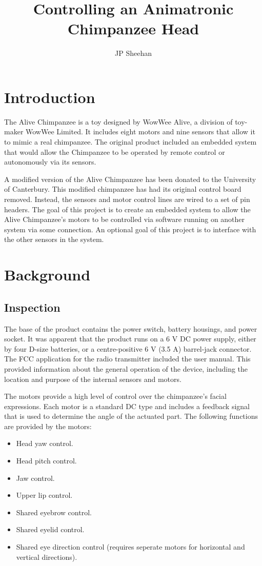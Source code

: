 \documentclass[11pt]{article} %
\title{Controlling an Animatronic Chimpanzee Head}
\author{JP Sheehan}
\begin{document}
\maketitle

\section{Introduction}

The Alive Chimpanzee is a toy designed by WowWee Alive, a division of toy-maker WowWee Limited. %
It includes eight motors and nine sensors that allow it to mimic a real chimpanzee.
The original product included an embedded system that would allow the Chimpanzee to be operated by remote control or autonomously via its sensors.


A modified version of the Alive Chimpanzee has been donated to the University of Canterbury.
This modified chimpanzee has had its original control board removed.
Instead, the sensors and motor control lines are wired to a set of pin headers.
The goal of this project is to create an embedded system to allow the Alive Chimpanzee's motors to be controlled via software running on another system via some connection.
An optional goal of this project is to interface with the other sensors in the system.

\section{Background}

\subsection{Inspection}

The base of the product contains the power switch, battery housings, and power socket.
It was apparent that the product runs on a 6 V DC power supply, either by four D-size batteries, or a centre-positive 6 V (3.5 A) barrel-jack connector.
The FCC application for the radio transmitter included the user manual. %
This provided information about the general operation of the device, including the location and purpose of the internal sensors and motors.

The motors provide a high level of control over the chimpanzee's facial expressions.
Each motor is a standard DC type and includes a feedback signal that is used to determine the angle of the actuated part.
The following functions are provided by the motors:
\begin{itemize}
	\item Head yaw control.
	\item Head pitch control.
	\item Jaw control.
	\item Upper lip control.
	\item Shared eyebrow control.
	\item Shared eyelid control.
	\item Shared eye direction control (requires seperate motors for horizontal and vertical directions).
\end{itemize}
\end{document}
